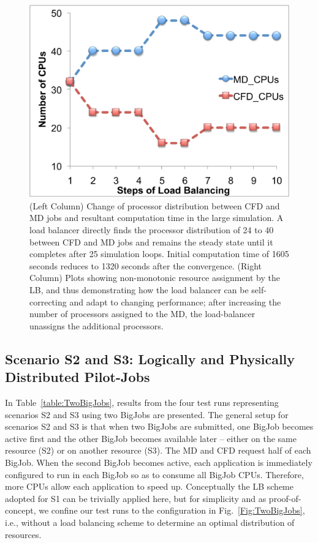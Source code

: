 \documentclass[conference,final]{IEEEtran}
\newcommand{\jhanote}[1]{ {\textcolor{red} { ***Jha: #1 }}}
\newcommand{\jhanote}[1]{}
\begin{document}
\begin{figure}
\includegraphics[scale=0.21]{fig7_22.pdf}
\caption{\small (Left Column) Change of processor distribution between
  CFD and MD jobs and resultant computation time in the large
  simulation. A load balancer directly finds the processor
  distribution of 24 to 40 between CFD and MD jobs and remains the
  steady state until it completes after 25 simulation loops. Initial
  computation time of 1605 seconds reduces to 1320 seconds after the
  convergence. (Right Column) Plots showing non-monotonic resource
  assignment by the LB, and thus demonstrating how the load balancer
  can be self-correcting and adapt to changing performance; after
  increasing the number of processors assigned to the MD, the
  load-balancer unassigns the additional processors.}
\label{Fig:LBLarge}
\end{figure}




\subsection{Scenario S2 and S3: Logically and Physically Distributed
  Pilot-Jobs}

In Table~\ref{table:TwoBigJobs}, results from the four test runs
representing scenarios S2 and S3 using two BigJobs are presented.  The
general setup for scenarios S2 and S3 is that when two BigJobs are
submitted, one BigJob becomes active first and the other BigJob
becomes available later -- either on the same resource (S2) or on
another resource (S3).  The MD and CFD request half of each
BigJob. When the second BigJob becomes active, each application is
immediately configured to run in each BigJob so as to consume all
BigJob CPUs. Therefore, more CPUs allow each application to speed
up. Conceptually the LB scheme adopted for S1 can be trivially applied
here, but for simplicity and as proof-of-concept, we confine our test
runs to the configuration in Fig.~\ref{Fig:TwoBigJobs}, i.e., without
a load balancing scheme to determine an optimal distribution of
resources.
\end{document}
